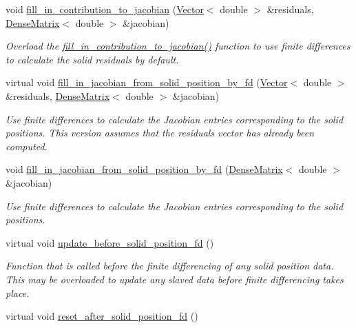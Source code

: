 \begin{DoxyCompactItemize}
void \hyperlink{classoomph_1_1SolidFiniteElement_a3167a2005e33815948bef357214e15ee}{fill\+\_\+in\+\_\+contribution\+\_\+to\+\_\+jacobian} (\hyperlink{classoomph_1_1Vector}{Vector}$<$ double $>$ \&residuals, \hyperlink{classoomph_1_1DenseMatrix}{Dense\+Matrix}$<$ double $>$ \&jacobian)
\begin{DoxyCompactList}\small\item\em Overload the \hyperlink{classoomph_1_1SolidFiniteElement_a3167a2005e33815948bef357214e15ee}{fill\+\_\+in\+\_\+contribution\+\_\+to\+\_\+jacobian()} function to use finite differences to calculate the solid residuals by default. \end{DoxyCompactList}\item 
virtual void \hyperlink{classoomph_1_1SolidFiniteElement_aa4d7dab326ceb0167da34ad4c535fa0d}{fill\+\_\+in\+\_\+jacobian\+\_\+from\+\_\+solid\+\_\+position\+\_\+by\+\_\+fd} (\hyperlink{classoomph_1_1Vector}{Vector}$<$ double $>$ \&residuals, \hyperlink{classoomph_1_1DenseMatrix}{Dense\+Matrix}$<$ double $>$ \&jacobian)
\begin{DoxyCompactList}\small\item\em Use finite differences to calculate the Jacobian entries corresponding to the solid positions. This version assumes that the residuals vector has already been computed. \end{DoxyCompactList}\item 
void \hyperlink{classoomph_1_1SolidFiniteElement_a3708a6f6b9b616ff44fa8b55cdbd0d34}{fill\+\_\+in\+\_\+jacobian\+\_\+from\+\_\+solid\+\_\+position\+\_\+by\+\_\+fd} (\hyperlink{classoomph_1_1DenseMatrix}{Dense\+Matrix}$<$ double $>$ \&jacobian)
\begin{DoxyCompactList}\small\item\em Use finite differences to calculate the Jacobian entries corresponding to the solid positions. \end{DoxyCompactList}\item 
virtual void \hyperlink{classoomph_1_1SolidFiniteElement_a51bdd2b180335e3ad41c6b818a2528e2}{update\+\_\+before\+\_\+solid\+\_\+position\+\_\+fd} ()
\begin{DoxyCompactList}\small\item\em Function that is called before the finite differencing of any solid position data. This may be overloaded to update any slaved data before finite differencing takes place. \end{DoxyCompactList}\item 
virtual void \hyperlink{classoomph_1_1SolidFiniteElement_afab2124e079912fe9bf39bf9df8a42c2}{reset\+\_\+after\+\_\+solid\+\_\+position\+\_\+fd} ()

\end{DoxyCompactItemize}
